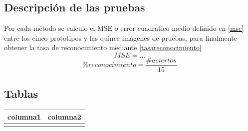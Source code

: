\documentclass[conference,spanish,a4paper,10pt,oneside,final]{tfmpd}
\begin{document}
\subsection{Descripción de las pruebas}
Por cada método se calculo el MSE o error cuadratico medio definido en \ref{mse} entre los cinco prototipos y las quince imágenes de pruebas, para finalmente obtener la tasa de reconocimiento mediante \ref{tasareconocimiento}
\begin{equation}
MSE=\ldots \label{mse}
\end{equation}
\begin{equation}
\% reconocimiento = \frac{\# aciertos}{15} \label{tasareconocimiento}
\end{equation}
%
%
%
%
%
\subsection{Tablas}
\begin{tabular}{cc}
\hline columna1 & columna2 \\ 
\hline  &  \\ 
\hline 
\end{tabular} 

%
%
%
%
\end{document}
